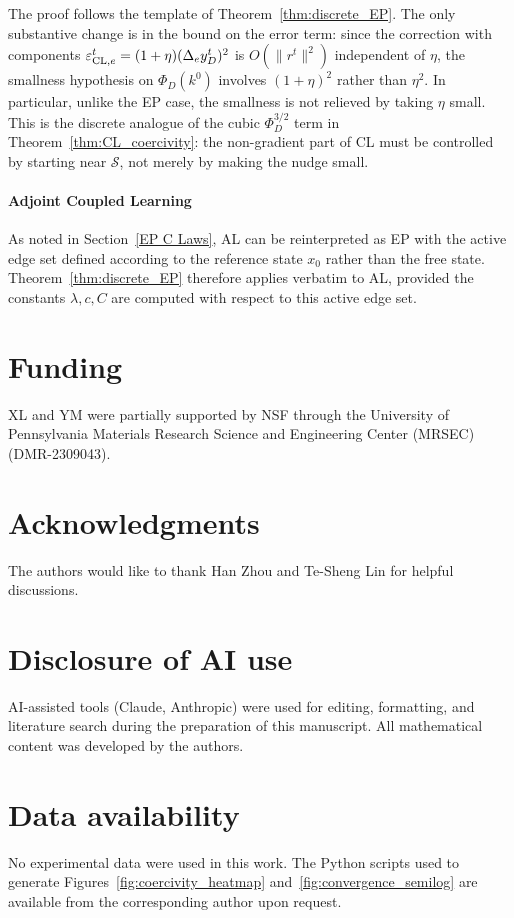 \documentclass{siamart}
\begin{document}
The proof follows the template of Theorem~\ref{thm:discrete_EP}. The only substantive change is in the bound on the error term: since the correction with components $\varepsilon^t_{{\rm CL},e} = (1+\eta)(\Delta_e y_D^t)^2$ is $O(\|r^t\|^2)$ independent of $\eta$, the smallness hypothesis on $\Phi_D(k^0)$ involves $(1+\eta)^2$ rather than $\eta^2$. In particular, unlike the EP case, the smallness is not relieved by taking $\eta$ small. This is the discrete analogue of the cubic $\Phi_D^{3/2}$ term in Theorem~\ref{thm:CL_coercivity}: the non-gradient part of CL must be controlled by starting near $\mathcal{S}$, not merely by making the nudge small.

\paragraph{Adjoint Coupled Learning}

As noted in Section~\ref{EP C Laws}, AL can be reinterpreted as EP with the active edge set defined according to the reference state $x_0$ rather than the free state. Theorem~\ref{thm:discrete_EP} therefore applies verbatim to AL, provided the constants $\lambda, c, C$ are computed with respect to this active edge set.
\section*{Funding}
XL and YM were partially supported by NSF through the University of Pennsylvania Materials Research Science and Engineering Center (MRSEC) (DMR-2309043).

\section*{Acknowledgments}
The authors would like to thank Han Zhou and Te-Sheng Lin for helpful discussions.

\section*{Disclosure of AI use}
AI-assisted tools (Claude, Anthropic) were used for editing, formatting, and literature search during the preparation of this manuscript. All mathematical content was developed by the authors.

\section*{Data availability}
No experimental data were used in this work. The Python scripts used to generate Figures~\ref{fig:coercivity_heatmap} and~\ref{fig:convergence_semilog} are available from the corresponding author upon request.
\end{document}
